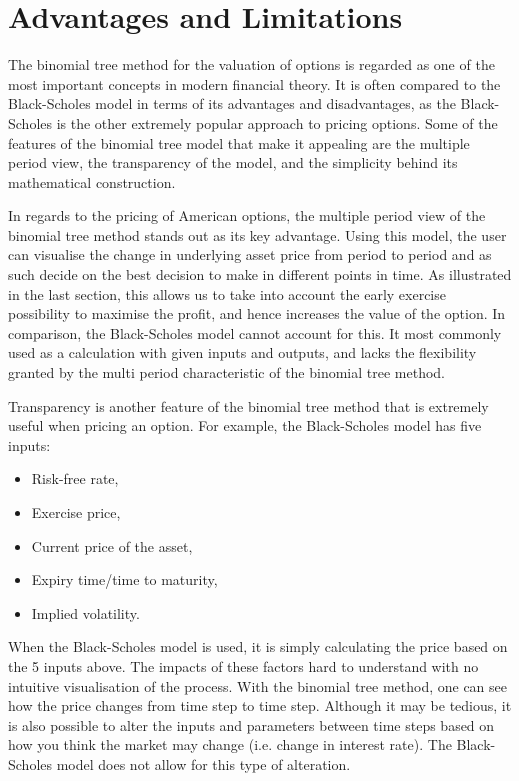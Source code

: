 \documentclass[letterpaper,12pt]{article}
\theoremstyle{plain}
\numberwithin{equation}{section}
\begin{document}
\section{Advantages and Limitations}
The binomial tree method for the valuation of options is regarded as one of the most important concepts in modern financial theory. It is often compared to the Black-Scholes model in terms of its advantages and disadvantages, as the Black-Scholes is the other extremely popular approach to pricing options. Some of the features of the binomial tree model that make it appealing are the multiple period view, the transparency of the model, and the simplicity behind its mathematical construction.

In regards to the pricing of American options, the multiple period view of the binomial tree method stands out as its key advantage. Using this model, the user can visualise the change in underlying asset price from period to period and as such decide on the best decision to make in different points in time. As illustrated in the last section, this allows us to take into account the early exercise possibility to maximise the profit, and hence increases the value of the option. In comparison, the Black-Scholes model cannot account for this. It most commonly used as a calculation with given inputs and outputs, and lacks the flexibility granted by the multi period characteristic of the binomial tree method.

Transparency is another feature of the binomial tree method that is extremely useful when pricing an option. For example, the Black-Scholes model has five inputs: 
\begin{itemize}
\item Risk-free rate,
\item Exercise price,
\item Current price of the asset,
\item Expiry time/time to maturity,
\item Implied volatility.
\end{itemize}
When the Black-Scholes model is used, it is simply calculating the price based on the 5 inputs above. The impacts of these factors hard to understand with no intuitive visualisation of the process. With the binomial tree method, one can see how the price changes from time step to time step. Although it may be tedious, it is also possible to alter the inputs and parameters between time steps based on how you think the market may change (i.e. change in interest rate). The Black-Scholes model does not allow for this type of alteration.
\end{document}
